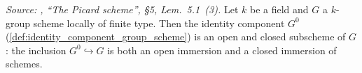 
\begin{theorem}
  \label{thm:identity_component_open_subgroup}

  \textit{Source: \cite{kleiman-picard}, ``The Picard scheme'', \S 5, Lem.~5.1~(3).}
  Let \(k\) be a field and \(G\) a \(k\)-group scheme locally of finite
  type. Then the identity component \(G^0\)
  (\cref{def:identity_component_group_scheme}) is an open and closed
  subscheme of \(G\): the inclusion \(G^0 \hookrightarrow G\) is both an
  open immersion and a closed immersion of schemes.
\end{theorem}

